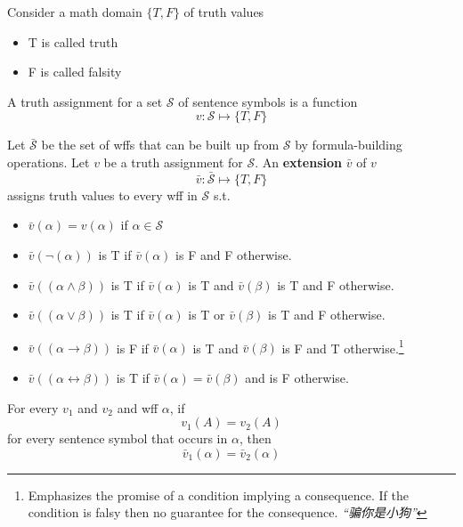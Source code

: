 Consider a math domain $\{T,F\}$ of truth values

\begin{itemize}
    \item T is called truth
    \item F is called falsity
\end{itemize}

\begin{definition}
    A truth assignment for a set $\mathcal{S}$ of sentence symbols is a function
    \[ v:\mathcal{S}\mapsto\{T,F\} \]
\end{definition}

\begin{definition}
    Let $\bar{\mathcal{S}}$ be the set of wffs that can be built up from $\mathcal{S}$ by formula-building operations. Let $v$ be a truth assignment for $\mathcal{S}$. An \textbf{extension} $\bar{v}$ of $v$
    \[ \bar{v}:\bar{\mathcal{S}}\mapsto \{T,F\} \]
    assigns truth values to every wff in $\mathcal{S}$ s.t.
    \begin{itemize}
        \item $\bar{v}(\alpha) = v(\alpha)$ if $\alpha \in \mathcal{S}$
        \item $\bar{v}(\neg(\alpha))$ is T if $\bar{v}(\alpha)$ is F and F otherwise.
        \item $\bar{v}((\alpha\wedge\beta))$ is T if $\bar{v}(\alpha)$ is T and $\bar{v}(\beta)$ is T and F otherwise.
        \item $\bar{v}((\alpha\vee\beta))$ is T if $\bar{v}(\alpha)$ is T or $\bar{v}(\beta)$ is T and F otherwise.
        \item $\bar{v}((\alpha\to\beta))$ is F if $\bar{v}(\alpha)$ is T and $\bar{v}(\beta)$ is F and T otherwise.\footnote{Emphasizes the promise of a condition implying a consequence. If the condition is falsy then no guarantee for the consequence. \emph{“骗你是小狗”}}
        \item $\bar{v}((\alpha\leftrightarrow\beta))$ is T if $\bar{v}(\alpha) = \bar{v}(\beta)$ and is F otherwise.
    \end{itemize}
\end{definition}

\begin{theorem}
    \label{thm:DeterminacyofTruthAssignments}
    For every $v_1$ and $v_2$ and wff $\alpha$, if
    \[ v_1(A) = v_2(A) \]
    for every sentence symbol that occurs in $\alpha$, then
    \[ \bar{v}_1(\alpha) = \bar{v}_2(\alpha) \]
\end{theorem}

